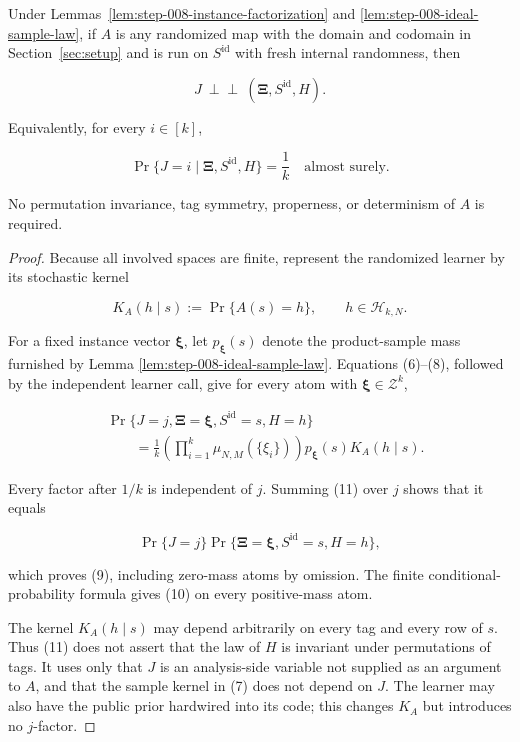 \begin{lemma}\label{lem:step-008-selector-independence}
Under Lemmas~\ref{lem:step-008-instance-factorization} and
\ref{lem:step-008-ideal-sample-law}, if \(A\) is any randomized map with the
domain and codomain in Section~\ref{sec:setup} and is run on
\(S^{\mathrm{id}}\) with fresh internal randomness, then

\[
J\ \perp\!\!\!\perp\
(\boldsymbol\Xi,S^{\mathrm{id}},H).
\tag{9}
\]

Equivalently, for every \(i\in[k]\),

\[
\Pr\{J=i\mid\boldsymbol\Xi,S^{\mathrm{id}},H\}=\frac1k
\quad\text{almost surely}.
\tag{10}
\]

No permutation invariance, tag symmetry, properness, or determinism of
\(A\) is required.
\end{lemma}

\begin{proof}
Because all involved spaces are finite, represent the randomized learner by
its stochastic kernel

\[
K_A(h\mid s):=\Pr\{A(s)=h\},
\qquad h\in\mathcal H_{k,N}.
\]

For a fixed instance vector \(\boldsymbol\xi\), let
\(p_{\boldsymbol\xi}(s)\) denote the product-sample mass furnished by
Lemma \ref{lem:step-008-ideal-sample-law}. Equations (6)--(8), followed by
the independent learner call, give for every atom with
\(\boldsymbol\xi\in\mathcal Z^k\),

\[
\begin{aligned}
&\Pr\{J=j,\boldsymbol\Xi=\boldsymbol\xi,
       S^{\mathrm{id}}=s,H=h\}\\
&\qquad=\frac1k
  \left(\prod_{i=1}^k\mu_{N,M}(\{\xi_i\})\right)
  p_{\boldsymbol\xi}(s)K_A(h\mid s).
\end{aligned}
\tag{11}
\]

Every factor after \(1/k\) is independent of \(j\). Summing (11) over
\(j\) shows that it equals

\[
\Pr\{J=j\}\Pr\{\boldsymbol\Xi=\boldsymbol\xi,
S^{\mathrm{id}}=s,H=h\},
\]

which proves (9), including zero-mass atoms by omission. The finite
conditional-probability formula gives (10) on every positive-mass atom.

The kernel \(K_A(h\mid s)\) may depend arbitrarily on every tag and every
row of \(s\). Thus (11) does not assert that the law of \(H\) is invariant
under permutations of tags. It uses only that \(J\) is an analysis-side
variable not supplied as an argument to \(A\), and that the sample kernel
in (7) does not depend on \(J\). The learner may also have the public prior
hardwired into its code; this changes \(K_A\) but introduces no \(j\)-factor.
\end{proof}

